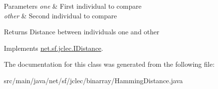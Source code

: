 \begin{DoxyParams}{Parameters}
{\em one} & First individual to compare \\
\hline
{\em other} & Second individual to compare\\
\hline
\end{DoxyParams}
\begin{DoxyReturn}{Returns}
Distance between individuals {\ttfamily one} and {\ttfamily other} 
\end{DoxyReturn}


Implements \hyperlink{interfacenet_1_1sf_1_1jclec_1_1_i_distance_a6f0220da1f5f7926f0ecc15c30b8a7d6}{net.\-sf.\-jclec.\-I\-Distance}.



The documentation for this class was generated from the following file\-:\begin{DoxyCompactItemize}
\item 
src/main/java/net/sf/jclec/binarray/Hamming\-Distance.\-java\end{DoxyCompactItemize}
